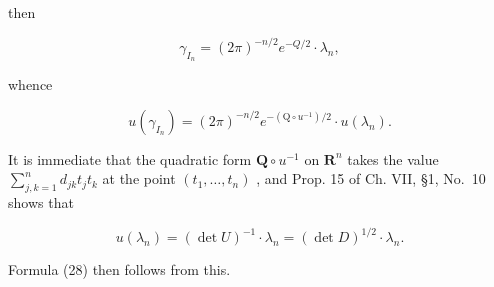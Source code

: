 then

\[
\gamma_ {I _ {n}} = (2 \pi) ^ {- n / 2} e ^ {- Q / 2} \cdot \lambda_ {n},
\]

whence

\[
u (\gamma_ {I _ {n}}) = (2 \pi) ^ {- n / 2} e ^ {- (\mathrm{Q} \circ u ^ {- 1}) / 2} \cdot u (\lambda_ {n}).\tag{29}
\]

It is immediate that the quadratic form \(\mathbf{Q} \circ u^{-1}\) on \(\mathbf{R}^n\) takes the value \(\sum_{j,k=1}^{n} d_{jk} t_j t_k\) at the point \((t_1, \ldots, t_n)\) , and Prop. 15 of Ch. VII, §1, No.~10 shows that

\[
u (\lambda_ {n}) = (\det U) ^ {- 1} \cdot \lambda_ {n} = (\det D) ^ {1 / 2} \cdot \lambda_ {n}.\tag{30}
\]

Formula (28) then follows from this.

